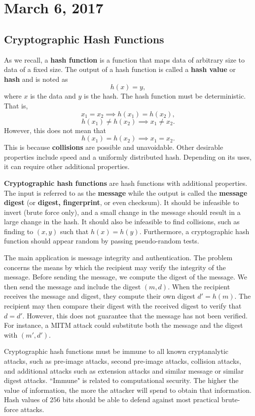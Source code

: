 \documentclass[11pt]{article}
\theoremstyle{plain} %
\theoremstyle{definition}
\theoremstyle{example}
\theoremstyle{remark}
\begin{document}
\section{March 6, 2017}

\subsection{Cryptographic Hash Functions}

As we recall, a \textbf{hash function} is a function that maps data of arbitrary size to data of a fixed size. The output of a hash function is called a \textbf{hash value} or \textbf{hash} and is noted as 
$$h(x) = y,$$
where $x$ is the data and $y$ is the hash. The hash function must be deterministic. That is, 
$$x_1 = x_2 \implies h(x_1) = h(x_2),$$
$$h(x_1) \neq h(x_2) \implies x_1 \neq x_2.$$
However, this does not mean that 
$$h(x_1) = h(x_2) \implies x_1=x_2.$$
This is because \textbf{collisions} are possible and unavoidable. Other desirable properties include speed and a uniformly distributed hash. Depending on its uses, it can require other additional properties. 

\textbf{Cryptographic hash functions} are hash functions with additional properties. The input is referred to as the \textbf{message} while the output is called the \textbf{message digest} (or \textbf{digest, fingerprint}, or even checksum). It should be infeasible to invert (brute force only), and a small change in the message should result in a large change in the hash. It should also be infeasible to find collisions, such as finding to $(x,y)$ such that $h(x) = h(y)$. Furthermore, a cryptographic hash function should appear random by passing pseudo-random tests. 

The main application is message integrity and authentication. The problem concerns the means by which the recipient may verify the integrity of the message. Before sending the message, we compute the digest of the message. We then send the message and include the digest $(m,d)$. When the recipient receives the message and digest, they compute their own digest $d' = h(m)$. The recipient may then compare their digest with the received digest to verify that $d = d'$. However, this does not guarantee that the message has not been verified. For instance, a MITM attack could substitute both the message and the digest with $(m', d')$. 

Cryptographic hash functions must be immune to all known cryptanalytic attacks, such as pre-image attacks, second pre-image attacks, collision attacks, and additional attacks such as extension attacks and similar message or similar digest attacks. ``Immune" is related to computational security. The higher the value of information, the more the attacker will spend to obtain that information. Hash values of $256$ bits should be able to defend against most practical brute-force attacks. 
\end{document}
